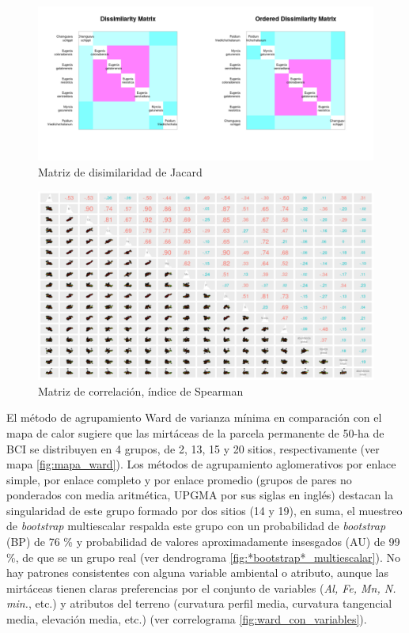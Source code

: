 \documentclass[11pt,]{article}
\begin{document}
\begin{figure}
\centering
\includegraphics{Disimilaridad_.png}
\caption{Matriz de disimilaridad de Jacard \label{fig:matriz_Jacard}}
\end{figure}

\begin{figure}
\centering
\includegraphics{matriz_correlacion_suelo_abun_riq_spearman.png}
\caption{Matriz de correlación, índice de Spearman
\label{fig:matriz_spearman}}
\end{figure}

El método de agrupamiento Ward de varianza mínima en comparación con el
mapa de calor sugiere que las mirtáceas de la parcela permanente de
50-ha de BCI se distribuyen en 4 grupos, de 2, 13, 15 y 20 sitios,
respectivamente (ver mapa \ref{fig:mapa_ward}). Los métodos de
agrupamiento aglomerativos por enlace simple, por enlace completo y por
enlace promedio (grupos de pares no ponderados con media aritmética,
UPGMA por sus siglas en inglés) destacan la singularidad de este grupo
formado por dos sitios (14 y 19), en suma, el muestreo de
\emph{bootstrap} multiescalar respalda este grupo con un probabilidad de
\emph{bootstrap} (BP) de 76 \% y probabilidad de valores aproximadamente
insesgados (AU) de 99 \%, de que se un grupo real (ver dendrograma
\ref {fig:*bootstrap*_multiescalar}). No hay patrones consistentes con
alguna variable ambiental o atributo, aunque las mirtáceas tienen claras
preferencias por el conjunto de variables (\emph{Al, Fe, Mn, N. min.},
etc.) y atributos del terreno (curvatura perfil media, curvatura
tangencial media, elevación media, etc.) (ver correlograma
\ref{fig:ward_con_variables}).
\end{document}
